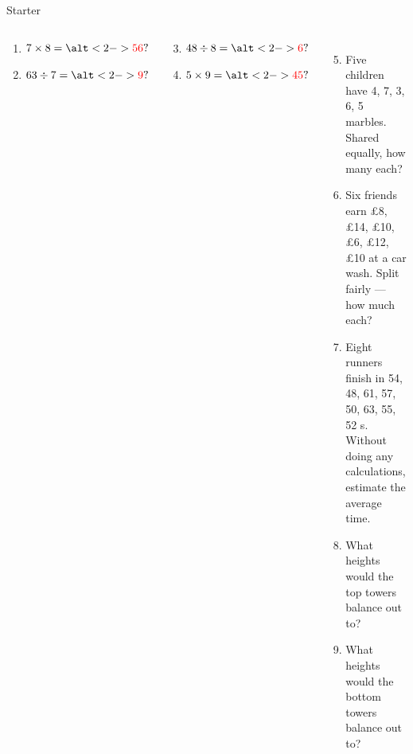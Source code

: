 \documentclass{beamer}
\newcommand{\ashow}[1]{\uncover<2->{\textcolor{red}{\small #1}}}
\newcommand{\ashowq}[1]{\alt<2->{\textcolor{red}{\small #1}}{?}}
\begin{document}
\begin{frame}{Starter}
\begin{columns}[T]
\footnotesize
\vspace{0.2em}
  \begin{multicols}{2}
  \begin{enumerate}
    \item $7 \times 8 = \ashowq{56}$
    \item $63 \div 7 = \ashowq{9}$
    \end{enumerate}
  \end{multicols}
  \begin{multicols}{2}
  \begin{enumerate}
  \setcounter{enumi}{2}
    \item $48 \div 8 = \ashowq{6}$
    \item $5 \times 9 = \ashowq{45}$
    \end{enumerate}
  \end{multicols}
  \begin{enumerate}
  \setcounter{enumi}{4}
  \item Five children have 4, 7, 3, 6, 5 marbles. Shared equally, how many each? \ashow{5 marbles}
  \item Six friends earn £8, £14, £10, £6, £12, £10 at a car wash. Split fairly — how much each? \ashow{\pounds10 each}
  \item Eight runners finish in 54, 48, 61, 57, 50, 63, 55, 52 s. Without doing any calculations, estimate the average time. \ashow{about 55 s}
  \item What heights would the top towers balance out to? \ashow{5 bricks high}
  \item What heights would the bottom towers balance out to? \ashow{4 bricks high}
\end{enumerate}

\end{columns}
\end{frame}
\end{document}
